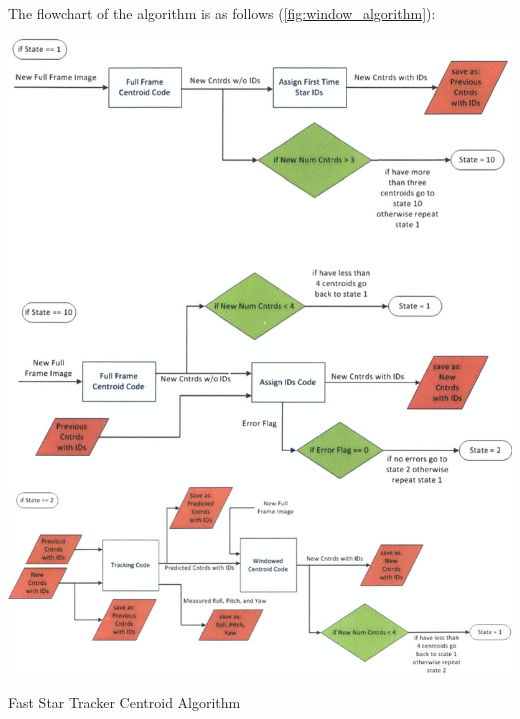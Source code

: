 \documentclass[../../main.tex]{subfiles}
\begin{document}
The flowchart of the algorithm is as follows (\ref{fig:window_algorithm}):
\begin{Flowchart}
        \centering
        \includegraphics[scale=0.55]{Figures/GNC/window_algorithm.png}
        \caption{Fast Star Tracker Centroid Algorithm}
        \label{fig:window_algorithm}
\end{Flowchart}
\end{document}
